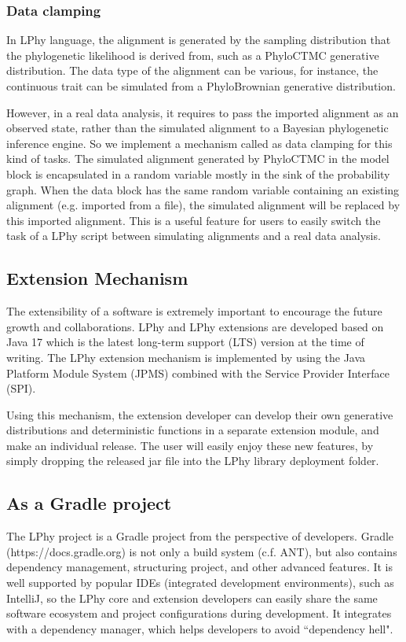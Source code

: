\documentclass[10pt,letterpaper,table]{article}
\begin{document}
{\subsubsection{Data clamping}
\label{sec:dataclamping}
In LPhy language, the alignment is generated by the sampling distribution that the phylogenetic likelihood is derived from, such as a PhyloCTMC generative distribution. The data type of the alignment can be various, for instance, the continuous trait can be simulated from a PhyloBrownian generative distribution. 

However, in a real data analysis, it requires to pass the imported alignment as an observed state, rather than the simulated alignment to a Bayesian phylogenetic inference engine. So we implement a mechanism called as data clamping for this kind of tasks. 
The simulated alignment generated by PhyloCTMC in the model block is encapsulated in a random variable mostly in the sink of the probability graph. 
When the data block has the same random variable containing an existing alignment (e.g. imported from a file), the simulated alignment will be replaced by this imported alignment. 
This is a useful feature for users to easily switch the task of a LPhy script between simulating alignments and a real data analysis. 


\subsection{Extension Mechanism}
The extensibility of a software is extremely important to encourage the future growth and collaborations. 
LPhy and LPhy extensions are developed based on Java 17 which is the latest long-term support (LTS) version at the time of writing. 
The LPhy extension mechanism is implemented by using the Java Platform Module System (JPMS) combined with the Service Provider Interface (SPI).

Using this mechanism, the extension developer can develop their own generative distributions and deterministic functions in a separate extension module, and make an individual release.
The user will easily enjoy these new features, by simply dropping the released jar file into the LPhy library deployment folder.

\subsection{As a Gradle project}
The LPhy project is a Gradle project from the perspective of developers. Gradle (https://docs.gradle.org) is not only a build system (c.f. ANT), but also contains dependency management, structuring project, and other advanced features. 
It is well supported by popular IDEs (integrated development environments), such as IntelliJ, so the LPhy core and extension developers can easily share the same software ecosystem and project configurations during development. 
It integrates with a dependency manager, which helps developers to avoid ``dependency hell". 

}
\end{document}
